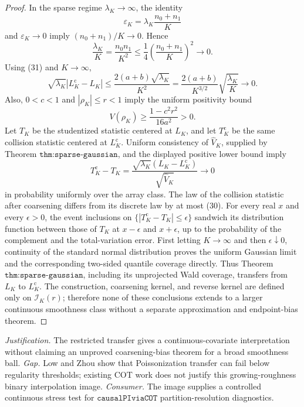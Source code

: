 \documentclass{article}
\begin{document}
\begin{proof}
In the sparse regime \(\lambda_K\to\infty\), the identity
\[
 \varepsilon_K
 =\lambda_K\frac{n_0+n_1}{K}
\]
and \(\varepsilon_K\to0\) imply
\((n_0+n_1)/K\to0\).  Hence
\[
 \frac{\lambda_K}{K}
 =\frac{n_0n_1}{K^2}
 \le\frac14\left(\frac{n_0+n_1}{K}\right)^2
 \longrightarrow0.
 \tag{33}
\]
Using (31) and \(K\to\infty\),
\[
 \sqrt{\lambda_K}|L_K^{\mathrm c}-L_K|
 \le\frac{2(a+b)\sqrt{\lambda_K}}{K^2}
 =\frac{2(a+b)}{K^{3/2}}
   \sqrt{\frac{\lambda_K}{K}}
 \longrightarrow0.
 \tag{34}
\]
Also, \(0<c<1\) and \(|\rho_K|\le r<1\) imply the uniform positivity
bound
\[
 V(\rho_K)\ge\frac{1-c^2r^2}{16a^2}>0.
\]
Let \(T_K\) be the studentized statistic centered at \(L_K\), and let
\(T_K^{\mathrm c}\) be the same collision statistic centered at
\(L_K^{\mathrm c}\).  Uniform consistency of \(\widehat V_K\), supplied
by Theorem \(\texttt{thm:sparse-gaussian}\), and the displayed positive
lower bound imply
\[
 T_K^{\mathrm c}-T_K
 =\frac{\sqrt{\lambda_K}(L_K-L_K^{\mathrm c})}
 {\sqrt{\widehat V_K}}
 \longrightarrow0
\]
in probability uniformly over the array class.  The law of the
collision statistic after coarsening differs from its discrete law by
at most (30).  For every real \(x\) and every \(\epsilon>0\), the event
inclusions on \(\{|T_K^{\mathrm c}-T_K|\le\epsilon\}\) sandwich its
distribution function between those of \(T_K\) at
\(x-\epsilon\) and \(x+\epsilon\), up to the probability of the
complement and the total-variation error.  First letting \(K\to\infty\)
and then \(\epsilon\downarrow0\), continuity of the standard normal
distribution proves the uniform Gaussian limit and the corresponding
two-sided quantile coverage directly.  Thus Theorem
\(\texttt{thm:sparse-gaussian}\), including its unprojected Wald
coverage, transfers from \(L_K\) to \(L_K^{\mathrm c}\).  The
construction, coarsening kernel, and reverse kernel are defined only on
\(\mathcal I_K(r)\); therefore none of these conclusions extends to a
larger continuous smoothness class without a separate approximation
and endpoint-bias theorem.
\end{proof}
\par\smallskip\noindent \textit{Justification.} The restricted transfer gives a continuous-covariate interpretation without claiming an unproved coarsening-bias theorem for a broad smoothness ball. \textit{Gap.} Low and Zhou show that Poissonization transfer can fail below regularity thresholds; existing COT work does not justify this growing-roughness binary interpolation image. \textit{Consumer.} The image supplies a controlled continuous stress test for \(\texttt{causalPIviaCOT}\) partition-resolution diagnostics.
\end{document}

